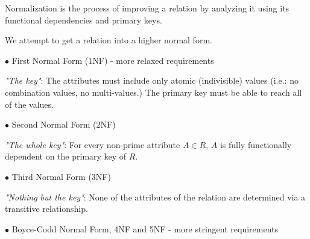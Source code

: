 \documentclass[english,openany]{book}
\begin{document}
    Normalization is the process of improving a relation by analyzing it using its functional dependencies and primary keys.

    We attempt to get a relation into a higher normal form.

    $\bullet$ First Normal Form (1NF) - more relaxed requirements

    \textit{"The key"}: The attributes must include only atomic (indivisible) values (i.e.: no combination values, no multi-values.) The primary key must be able to reach all of the values.

    $\bullet$ Second Normal Form (2NF)

    \textit{"The whole key"}: For every non-prime attribute $A \in R$, $A$ is fully functionally dependent on the primary key of $R$.

    $\bullet$ Third Normal Form (3NF)

    \textit{"Nothing but the key"}: None of the attributes of the relation are determined via a transitive relationship.

    $\bullet$ Boyce-Codd Normal Form, 4NF and 5NF - more stringent requirements
\end{document}

